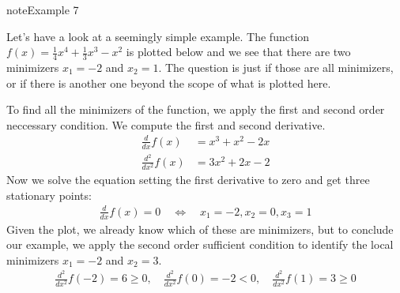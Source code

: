 \documentclass[letterpaper,10pt,english]{jupyterBook}
\begin{document}
\begin{sphinxadmonition}{note}{Example 7}



\sphinxAtStartPar
Let’s have a look at a seemingly simple example. The function \(f(x) = \frac14x^4 + \frac13x^3 -x^2\) is plotted below and we see that there are two minimizers \(x_1=-2\) and \(x_2=1\). The question is just if those are all minimizers, or if there is another one beyond the scope of what is plotted here.
\begin{center}\end{center}
\sphinxAtStartPar
To find all the minimizers of the function, we apply the first and second order neccessary condition. We compute the first and second derivative.
\begin{align*}
    \frac{d}{dx} f(x) &= x^3 + x^2 -2x \\
    \frac{d^2}{dx^2}f(x) & = 3x^2 + 2x -2
\end{align*}
\sphinxAtStartPar
Now we solve the equation setting the first derivative to zero and get three stationary points:
\begin{equation*}
\begin{split}\frac{d}{dx} f(x) =0 \quad \Leftrightarrow \quad x_1=-2, x_2 = 0, x_3=1\end{split}
\end{equation*}
Given the plot, we already know which of these are minimizers, but to conclude our example, we apply the second order sufficient condition to identify the local minimizers \(x_1=-2\) and \(x_2=3\).
\begin{equation*}
\begin{split}\frac{d^2}{dx^2}f(-2)=6\geq 0,\quad \frac{d^2}{dx^2}f(0)=-2< 0,\quad \frac{d^2}{dx^2}f(1)=3\geq 0 \end{split}
\end{equation*}\end{sphinxadmonition}
\end{document}
